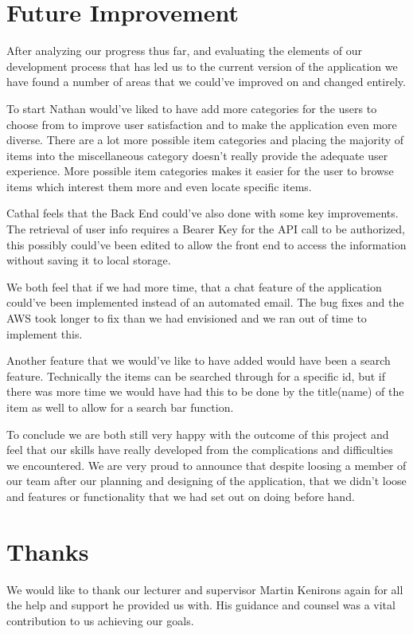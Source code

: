 \section{Future Improvement}
After analyzing our progress thus far, and evaluating the elements of our development process that has led us to the current version of the application we have found a number of areas that we could've improved on and changed entirely.\par
To start Nathan would've liked to have add more categories for the users to choose from to improve user satisfaction and to make the application even more diverse. There are a lot more possible item categories and placing the majority of items into the miscellaneous category doesn't really provide the adequate user experience. More possible item categories makes it easier for the user to browse items which interest them more and even locate specific items. \par
Cathal feels that the Back End could've also done with some key improvements. The retrieval of user info requires a Bearer Key for the API call to be authorized, this possibly could've been edited to allow the front end to access the information without saving it to local storage. \par
We both feel that if we had more time, that a chat feature of the application could've been implemented instead of an automated email. The bug fixes and the AWS took longer to fix than we had envisioned and we ran out of time to implement this. \par
Another feature that we would've like to have added would have been a search feature. Technically the items can be searched through for a specific id, but if there was more time we would have had this to be done by the title(name) of the item as well to allow for a search bar function.\par
To conclude we are both still very happy with the outcome of this project and feel that our skills have really developed from the complications and difficulties we encountered. We are very proud to announce that despite loosing a member of our team after our planning and designing of the application, that we didn't loose and features or functionality that we had set out on doing before hand.

\section{Thanks}
We would like to thank our lecturer and supervisor Martin Kenirons again for all the help and support he provided us with. His guidance and counsel was a vital contribution to us achieving our goals.
